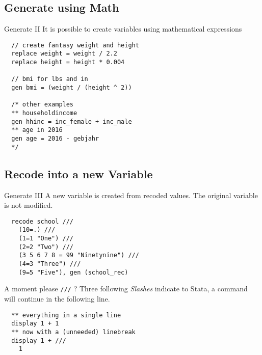 \subsection{Generate using Math}
\begin{frame}[fragile]{Generate II}  
It is possible to create variables using mathematical expressions
\begin{lstlisting}
  // create fantasy weight and height
  replace weight = weight / 2.2
  replace height = height * 0.004

  // bmi for lbs and in
  gen bmi = (weight / (height ^ 2))

  /* other examples
  ** householdincome
  gen hhinc = inc_female + inc_male
  ** age in 2016
  gen age = 2016 - gebjahr
  */
\end{lstlisting}
\end{frame}

\subsection{Recode into a new Variable}
\begin{frame}[fragile]{Generate III}  
A new variable is created from recoded values. The original variable is not modified.
\begin{lstlisting}
  recode school ///
    (10=.) ///
    (1=1 "One") ///
    (2=2 "Two") ///
    (3 5 6 7 8 = 99 "Ninetynine") ///
    (4=3 "Three") ///
    (9=5 "Five"), gen (school_rec)
\end{lstlisting}


\end{frame}

\begin{frame}[fragile]{A moment please \texttt{///} ?}    
Three following \textit{Slashes} indicate to Stata, a command will continue in the following line.
\begin{lstlisting}
  ** everything in a single line
  display 1 + 1 
  ** now with a (unneeded) linebreak
  display 1 + ///
    1
\end{lstlisting}

\end{frame}

